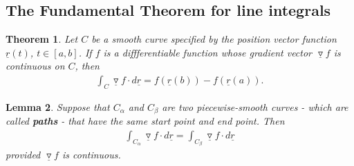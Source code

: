 \documentclass{article}
\theoremstyle{sltheorem}
\newtheorem{theorem}{Theorem}[section]
\newtheorem{lemma}[theorem]{Lemma}
\newcommand{\grad}{\vec\triangledown}
\renewcommand{\vec}{\underline}
\newcommand*\B[1]{\textbf{#1}}
\begin{document}
\subsection{The Fundamental Theorem for line integrals}
\begin{theorem}
    Let $C$ be a smooth curve specified by the position vector function 
    $\vec r(t)$, $t\in[a,b]$. If $f$ is a diffferentiable function
    whose gradient vector $\grad f$ is continuous on $C$, then
    \begin{align*}
        \int_C \grad f\cdot d\vec r = f(\vec r(b)) - f(\vec r(a)).
    \end{align*}
\end{theorem}
\begin{lemma}
    Suppose that $C_\alpha$ and $C_\beta$ are two piecewise-smooth curves
    - which are called \B{paths} - that have the same start point and end
    point. Then
    \begin{align*}
        \int_{C_\alpha} \grad f \cdot d\vec r = \int_{C_\beta} \grad f \cdot d\vec r
    \end{align*}
    provided $\grad f$ is continuous.
\end{lemma}
\end{document}

